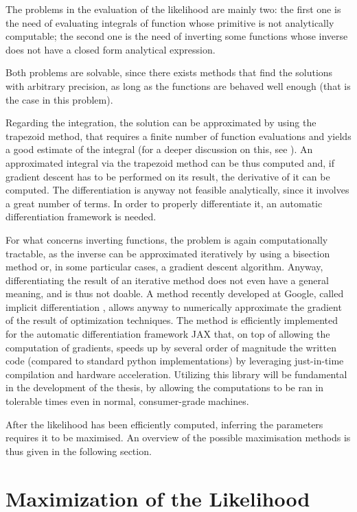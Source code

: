 The problems in the evaluation of the likelihood are mainly two:
the first one is the need of evaluating integrals of function whose primitive is not analytically computable;
the second one is the need of inverting some functions whose inverse does not have a closed form analytical expression.

Both problems are solvable,
since there exists methods that find the solutions with arbitrary precision,
as long as the functions are behaved well enough (that is the case in this problem).

Regarding the integration, the solution can be approximated by using the  trapezoid method,
that requires a finite number of function evaluations and yields a good estimate of the integral
(for a deeper discussion on this, see \cite{Sueli_Mayers_2003}).
An approximated integral via the trapezoid method can be thus computed and,
if gradient descent has to be performed on its result,
the derivative of it can be computed.
The differentiation is anyway not feasible analytically, since it involves a great number of terms.
In order to properly differentiate it,
an automatic differentiation framework is needed.

For what concerns inverting functions, the problem is again computationally tractable,
as the inverse can be approximated iteratively by using a bisection method or,
in some particular cases, a gradient descent algorithm.
Anyway, differentiating the result of an iterative method does not even have a general meaning,
and is thus not doable.
A method recently developed at Google,
called implicit differentiation \parencite{DBLP:journals/corr/abs-2105-15183},
allows anyway to numerically approximate the gradient of the result of optimization techniques.
The method is efficiently implemented for the automatic differentiation framework JAX \parencite{jax2018github}
that, on top of allowing the computation of gradients,
speeds up by several order of magnitude the written code (compared to standard python implementations)
by leveraging just-in-time compilation and hardware acceleration.
Utilizing this library will be fundamental in the development of the thesis,
by allowing the computations to be ran in tolerable times even in normal, consumer-grade machines.

After the likelihood has been efficiently computed,
inferring the parameters requires it to be maximised.
An overview of the possible maximisation methods is thus given in the following section.

\section{Maximization of the Likelihood}
\label{sec:max_lik_meth}

